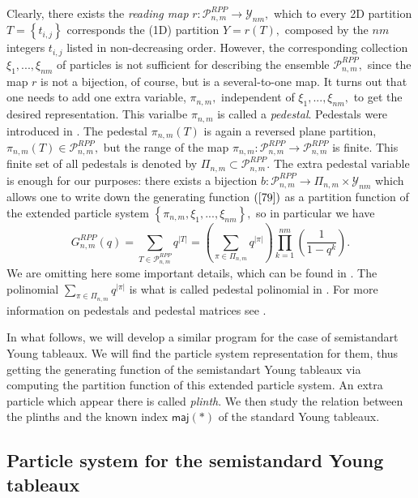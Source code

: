 \documentclass[12pt]{article}%
\begin{document}
Clearly, there exists the \textit{reading map} $r:\mathcal{P}_{n,m}%
^{RPP}\rightarrow\mathcal{Y}_{nm},$ which to every 2D partition $T=\left\{
t_{i,j}\right\}  $ corresponds the (1D) partition $Y=r\left(  T\right)  ,$
composed by the $nm$ integers $t_{i,j}$ listed in non-decreasing order.
However, the corresponding collection $\xi_{1},...,\xi_{nm}$ of particles is
not sufficient for describing the ensemble $\mathcal{P}_{n,m}^{RPP},$ since
the map $r$ is not a bijection, of course, but is a several-to-one map. It
turns out that one needs to add one extra variable, $\pi_{n,m},$ independent
of $\xi_{1},...,\xi_{nm},$ to get the desired representation. This varialbe
$\pi_{n,m}$ is called a \textit{pedestal}. Pedestals were introduced in
\cite{S}. The pedestal $\pi_{n,m}\left(  T\right)  $ is again a reversed plane
partition, $\pi_{n,m}\left(  T\right)  \in\mathcal{P}_{n,m}^{RPP},$ but the
range of the map $\pi_{n,m}:\mathcal{P}_{n,m}^{RPP}\rightarrow\mathcal{P}%
_{n,m}^{RPP}$ is finite. This finite set of all pedestals is denoted by
$\Pi_{n,m}\subset\mathcal{P}_{n,m}^{RPP}.$ The extra pedestal variable is
enough for our purposes: there exists a bijection $b:\mathcal{P}_{n,m}%
^{RPP}\rightarrow\Pi_{n,m}\times\mathcal{Y}_{nm}$ which allows one to write
down the generating function $\left(  \ref{79}\right)  $ as a partition
function of the extended particle system $\left\{  \pi_{n,m},\xi_{1}%
,...,\xi_{nm}\right\}  ,$ so in particular we have%
\[
G_{n,m}^{RPP}\left(  q\right)  =\sum_{T\in\mathcal{P}_{n,m}^{RPP}%
}q^{\left\vert T\right\vert }=\left(  \sum_{\pi\in\Pi_{n,m}}q^{\left\vert
\pi\right\vert }\right)  \prod_{k=1}^{nm}\left(  \frac{1}{1-q^{k}}\right)  .
\]
We are omitting here some important details, which can be found in \cite{S}.
The polinomial $\sum_{\pi\in\Pi_{n,m}}q^{\left\vert \pi\right\vert }$ is what
is called pedestal polinomial in \cite{OS}. For more information on pedestals
and pedestal matrices see \cite{KKOPSS}.

In what follows, we will develop a similar program for the case of
semistandart Young tableaux. We will find the particle system representation
for them, thus getting the generating function of the semistandart Young
tableaux via computing the partition function of this extended particle
system. An extra particle which appear there is called \textit{plinth}. We
then study the relation between the plinths and the known index $\mathsf{maj}%
\left(  \ast\right)  $ of the standard Young tableaux.

\subsection{Particle system for the semistandard Young tableaux}
\end{document}
